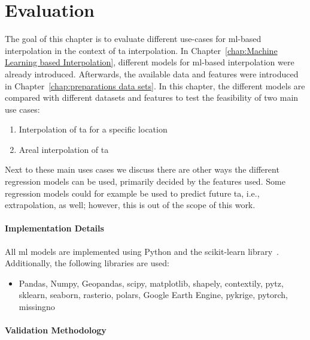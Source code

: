 \chapter{Evaluation}
\label{chap:Evaluation}

The goal of this chapter is to evaluate different use-cases for \gls{ml}-based interpolation in the context of \gls{ta} interpolation. In Chapter~\ref{chap:Machine Learning based Interpolation}, different models for \gls{ml}-based interpolation were already introduced. Afterwards, the available data and features were introduced in Chapter~\ref{chap:preparations data sets}. In this chapter, the different models are compared with different datasets and features to test the feasibility of two main use cases:

\begin{enumerate}
  \item Interpolation of \gls{ta} for a specific location
  \item Areal interpolation of \gls{ta}
\end{enumerate}

Next to these main uses cases we discuss there are other ways the different regression models can be used, primarily decided by the features used. Some regression models could for example be used to predict future \gls{ta}, i.e., extrapolation, as well; however, this is out of the scope of this work.

\subsubsection{Implementation Details}

All \gls{ml} models are implemented using Python and the scikit-learn library~\cite{scikit-learn}. Additionally, the following libraries are used:

\begin{itemize}
  \item Pandas, Numpy, Geopandas, scipy, matplotlib, shapely, contextily, pytz, sklearn, seaborn, rasterio, polars, Google Earth Engine, pykrige, pytorch, missingno
\end{itemize}

\subsubsection{Validation Methodology}
\label{sec:validation methodology}

